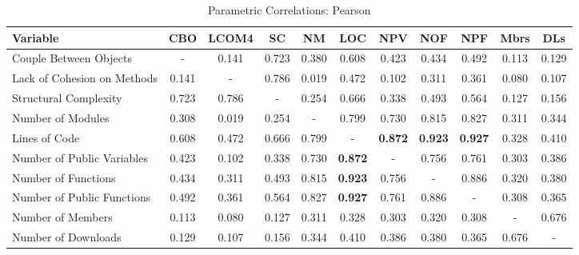 \documentclass[conference]{IEEEtran}
\begin{document}
\begin{center}
\begin{table}[hbt]
\centering \caption{Parametric Correlations: Pearson}
\begin{tabular}{|l|c|c|c|c|c|c|c|c|c|c|} \hline

\textbf{Variable}           & CBO & LCOM4 & SC & NM & LOC & NPV & NOF & NPF & Mbrs & DLs
\\ \hline
Couple Between Objects      & - & 0.141 & 0.723 & 0.380 & 0.608 & 0.423 & 0.434 & 0.492 & 0.113 & 0.129
\\ \hline
Lack of Cohesion on Methods & 0.141 & - & 0.786 & 0.019 & 0.472 & 0.102 & 0.311 & 0.361 & 0.080 & 0.107
\\ \hline
Structural Complexity       & 0.723 & 0.786 & - & 0.254 & 0.666 & 0.338 & 0.493 & 0.564 & 0.127 & 0.156
\\ \hline
Number of Modules           & 0.308 & 0.019 & 0.254 & - & 0.799 & 0.730 & 0.815 & 0.827 & 0.311 & 0.344
\\ \hline
Lines of Code               & 0.608 & 0.472 & 0.666 & 0.799 & - & \textbf{0.872} & \textbf{0.923} & \textbf{0.927} & 0.328 & 0.410
\\ \hline
Number of Public Variables  & 0.423 & 0.102 & 0.338 & 0.730 & \textbf{0.872} & - & 0.756 & 0.761 & 0.303 & 0.386
\\ \hline
Number of Functions         & 0.434 & 0.311 & 0.493 & 0.815 & \textbf{0.923} & 0.756 & - & 0.886 & 0.320 & 0.380
\\ \hline
Number of Public Functions  & 0.492 & 0.361 & 0.564 & 0.827 & \textbf{0.927} & 0.761 & 0.886 & - & 0.308 & 0.365
\\ \hline
Number of Members           & 0.113 & 0.080 & 0.127 & 0.311 & 0.328 & 0.303 & 0.320 & 0.308 & - & 0.676
\\ \hline
Number of Downloads         & 0.129 & 0.107 & 0.156 & 0.344 & 0.410 & 0.386 & 0.380 & 0.365 & 0.676 & -
\\ \hline
\end{tabular}
\label{pearson}
\end{table}
\end{center}
\end{document}
